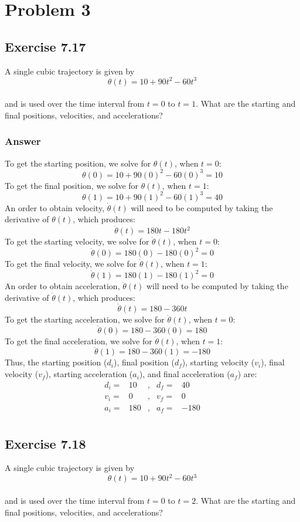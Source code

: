 \documentclass[10pt]{article}
\begin{document}
\section*{Problem 3} %
\subsection*{Exercise 7.17}
A single cubic trajectory is given by \\
\[
\theta(t) = 10 + 90t^2 - 60t^3
\]
\\
and is used over the time interval from \(t = 0\) to \(t = 1\). What are the starting and final positions, velocities, and accelerations?
\subsubsection*{Answer}
To get the starting position, we solve for \(\theta(t)\), when \(t = 0\):
\[\theta(0) = 10 + 90(0)^2 - 60(0)^3 = 10\]
To get the final position, we solve for \(\theta(t)\), when \(t = 1\):
\[\theta(1) = 10 + 90(1)^2 - 60(1)^3 = 40\]
An order to obtain velocity, \(\dot{\theta}(t)\) will need to be computed by taking the derivative of \(\theta(t)\), which produces:
\[\dot{\theta}(t) = 180t - 180t^2\]
To get the starting velocity, we solve for \(\dot{\theta}(t)\), when \(t = 0\):
\[\dot{\theta}(0) = 180(0) - 180(0)^2 = 0\]
To get the final velocity, we solve for \(\dot{\theta}(t)\), when \(t = 1\):
\[\dot{\theta}(1) = 180(1) - 180(1)^2 = 0\]
An order to obtain acceleration, \(\ddot{\theta}(t)\) will need to be computed by taking the derivative of \(\dot{\theta}(t)\), which produces:
\[\ddot{\theta}(t) = 180 - 360t\]
To get the starting acceleration, we solve for \(\ddot{\theta}(t)\), when \(t = 0\):
\[\ddot{\theta}(0) = 180 - 360(0) = 180\]
To get the final acceleration, we solve for \(\ddot{\theta}(t)\), when \(t = 1\):
\[\ddot{\theta}(1) = 180 - 360(1) = -180\]
Thus, the starting position (\(d_i\)), final position (\(d_f\)), starting velocity (\(v_i\)), final velocity (\(v_f\)), starting acceleration (\(a_i\)), and final acceleration (\(a_f\)) are:
\[
\begin{array}{lrllr}
    d_i = &10 &,& d_f = &40  \\
    v_i = &0  &,& v_f = &0   \\
    a_i = &180 &,& a_f = &-180 \\
\end{array}
\]
\pagebreak
\subsection*{Exercise 7.18}
A single cubic trajectory is given by \\
\[
\theta(t) = 10 + 90t^2 - 60t^3
\]
\\
and is used over the time interval from \(t = 0\) to \(t = 2\). What are the starting and final positions, velocities, and accelerations?
\end{document}
